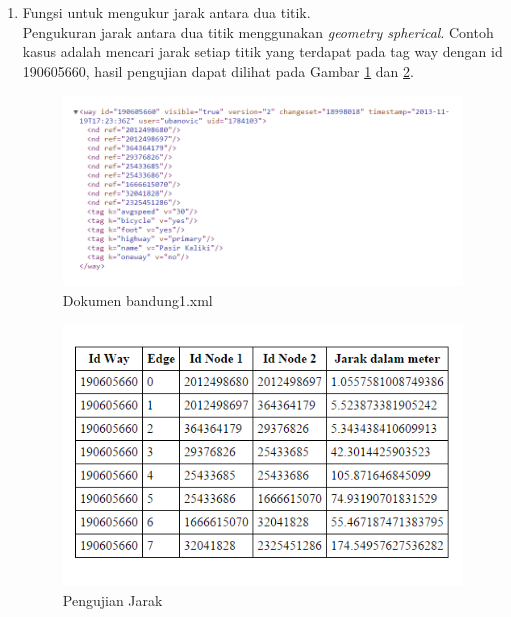 \begin{enumerate}
  \item Fungsi untuk mengukur jarak antara dua titik.\\
  Pengukuran jarak antara dua titik menggunakan \textit{geometry spherical}.
  Contoh kasus adalah mencari jarak setiap titik yang terdapat pada tag way
  dengan id 190605660, hasil pengujian dapat dilihat pada Gambar
  \ref{fig:pu_jarak1} dan \ref{fig:pu_jarak2}.
\begin{figure}[h]
\centering
\includegraphics[scale=0.7]{Gambar/pu_jarak1}
\caption[Dokumen bandung1.xml]{Dokumen bandung1.xml}
\label{fig:pu_jarak1}
\end{figure}

\begin{figure}[h]
\centering
\includegraphics[scale=1]{Gambar/pu_jarak2}
\caption[Pengujian Jarak]{Pengujian Jarak}
\label{fig:pu_jarak2}
\end{figure}


\end{enumerate}
